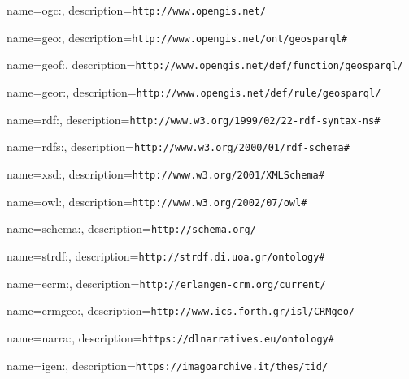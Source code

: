 

{       name={ogc:},
        description={\texttt{http://www.opengis.net/}}
}

{       name={geo:},
        description={\texttt{http://www.opengis.net/ont/geosparql#}}
}

{       name={geof:},
        description={\texttt{http://www.opengis.net/def/function/geosparql/}}
}

{       name={geor:},
        description={\texttt{http://www.opengis.net/def/rule/geosparql/}}
}

{       name={rdf:},
        description={\texttt{http://www.w3.org/1999/02/22-rdf-syntax-ns#}}
}

{       name={rdfs:},
        description={\texttt{http://www.w3.org/2000/01/rdf-schema#}}
}

{       name={xsd:},
        description={\texttt{http://www.w3.org/2001/XMLSchema#}}
}

{       name={owl:},
        description={\texttt{http://www.w3.org/2002/07/owl#}}
}

{       name={schema:},
        description={\texttt{http://schema.org/}}
}

{       name={strdf:},
        description={\texttt{http://strdf.di.uoa.gr/ontology#}}
}

{       name={ecrm:},
        description={\texttt{http://erlangen-crm.org/current/}}
}

{       name={crmgeo:},
        description={\texttt{http://www.ics.forth.gr/isl/CRMgeo/}}
}

{       name={narra:},
        description={\texttt{https://dlnarratives.eu/ontology#}}
}

{       name={igen:},
        description={\texttt{https://imagoarchive.it/thes/tid/}}
}

